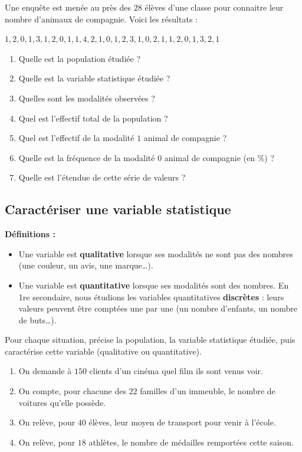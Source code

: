 \documentclass[../../syllabus_1.tex]{subfiles}
\begin{document}
\newpage
\begin{exercise}
    Une enquête est menée au près des $28$ élèves d'une classe pour connaitre leur nombre d'animaux de compagnie. Voici les résultats :
    \begin{center}
        $1, 2, 0, 1, 3, 1, 2, 0, 1, 1, 4, 2, 1, 0, 1, 2, 3, 1, 0, 2, 1, 1, 2, 0, 1, 3, 2, 1$
    \end{center}
    \begin{enumerate}[itemsep=1cm]
        \item Quelle est la population étudiée ?
        \item Quelle est la variable statistique étudiée ?
        \item Quelles sont les modalités observées ?
        \item Quel est l'effectif total de la population ?
        \item Quel est l'effectif de la modalité $1$ animal de compagnie  ?
        \item Quelle est la fréquence de la modalité $0$ animal de compagnie (en \%) ?
        \item Quelle est l'étendue de cette série de valeurs ?
    \end{enumerate}
    \vspace{1cm}
\end{exercise}

\subsection{Caractériser une variable statistique}

\textbf{Définitions :}
\begin{itemize}
    \item Une variable est \textbf{qualitative} lorsque ses modalités ne sont pas des nombres (une couleur, un avis, une marque\dots).
    \item Une variable est \textbf{quantitative} lorsque ses modalités sont des nombres. En 1re secondaire, nous étudions les variables quantitatives \textbf{discrètes} : leurs valeurs peuvent être comptées une par une (un nombre d'enfants, un nombre de buts\dots).
\end{itemize}

\newpage
\begin{exercise}
    Pour chaque situation, précise la population, la variable statistique étudiée, puis caractérise cette variable (qualitative ou quantitative).
    \begin{enumerate}[itemsep=1.2cm]
        \item On demande à $150$ clients d'un cinéma quel film ils sont venus voir.
        \item On compte, pour chacune des $22$ familles d'un immeuble, le nombre de voitures qu'elle possède.
        \item On relève, pour $40$ élèves, leur moyen de transport pour venir à l'école.
        \item On relève, pour $18$ athlètes, le nombre de médailles remportées cette saison.
    \end{enumerate}
\end{exercise}
\end{document}
